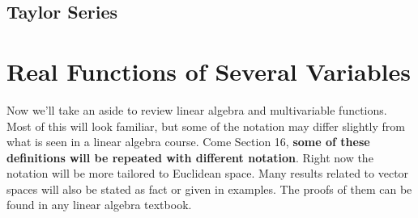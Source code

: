 \documentclass{article}
\theoremstyle{definition}
\begin{document}
\subsection{Taylor Series}
\section{Real Functions of Several Variables}
Now we'll take an aside to review linear algebra and multivariable functions. Most of this will look familiar, but some of the notation may differ slightly from what is seen in a linear algebra course. Come Section 16, \textbf{some of these definitions will be repeated with different notation}. Right now the notation will be more tailored to Euclidean space. Many results related to vector spaces will also be stated as fact or given in examples. The proofs of them can be found in any linear algebra textbook. 
\end{document}
